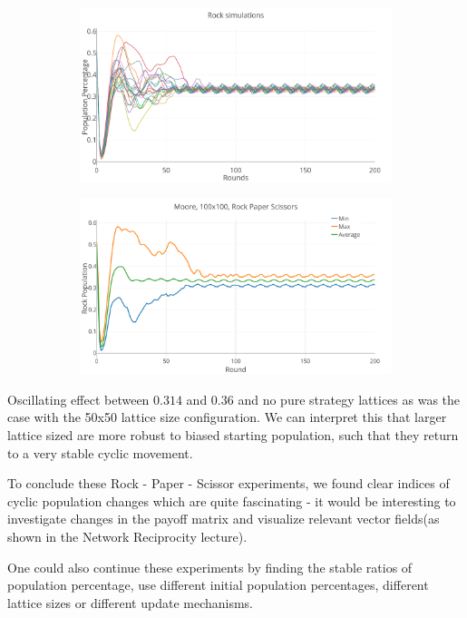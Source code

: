 \documentclass[a4paper, 11pt]{article}
\begin{document}
\begin{landscape}
\begin{figure}[H]
	\begin{subfigure}{0.75\textwidth}
		\includegraphics[width=1\linewidth]{100x100_50RockDist_IndividualRock}
	\end{subfigure}%
	\begin{subfigure}{0.75\textwidth}
		\includegraphics[width=1\linewidth]{100x100_50RockDist_Rock}
	\end{subfigure}
	
\end{figure}

Oscillating effect between $0.314$ and $0.36$ and no pure strategy lattices as was the case with the 50x50 lattice size configuration. We can interpret this that larger lattice sized are more robust to biased starting population, such that they return to a very stable cyclic movement.

To conclude these Rock - Paper - Scissor experiments, we found clear indices of cyclic population changes which are quite fascinating - it would be interesting to investigate changes in the payoff matrix and visualize relevant vector fields(as shown in the Network Reciprocity lecture).

One could also continue these experiments by finding the stable ratios of population percentage, use different initial population percentages, different lattice sizes or different update mechanisms. 


\end{landscape}
\end{document}
